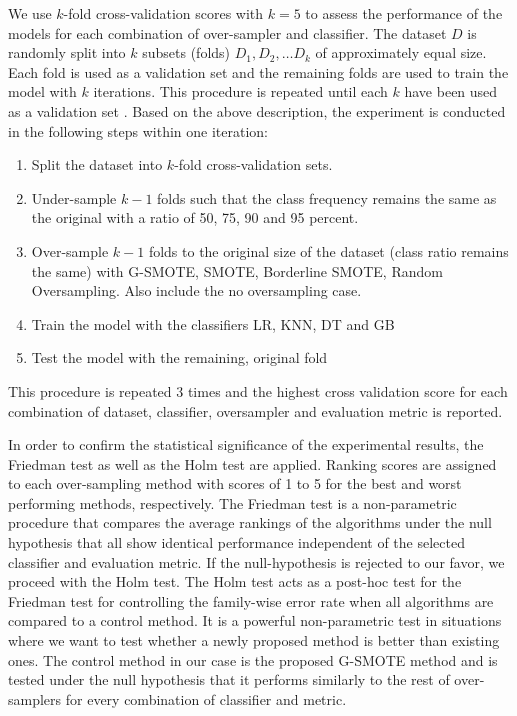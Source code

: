\documentclass[parskip=full]{scrartcl}
\begin{document}
We use \( k \)-fold cross-validation scores with \( k = 5 \) to assess the
performance of the models for each combination of over-sampler and classifier.
The dataset \( D \) is randomly split into \( k \) subsets (folds) \( D_1, D_2,
… D_k \) of approximately equal size. Each fold is used as a validation set and
the remaining folds are used to train the model with \( k \) iterations. This
procedure is repeated until each \( k \) have been used as a validation set
\cite{Han.2012}. Based on the above description, the experiment is conducted in
the following steps within one iteration:

\begin{enumerate}
	
	\item 
	Split the dataset into \( k \)-fold cross-validation sets.

	\item 
	Under-sample \( k - 1 \) folds such that the class frequency remains 
	the same as the original with a ratio of 50, 75, 90 and 95 percent.

	\item 
	Over-sample \( k - 1 \) folds to the original size of the
	dataset (class ratio remains the same) with G-SMOTE, SMOTE, Borderline
	SMOTE, Random Oversampling. Also include the no oversampling case.

	\item 
	Train the model with the classifiers LR, KNN, DT and GB

	\item 
	Test the model with the remaining, original fold

\end{enumerate}	

This procedure is repeated 3 times and the highest cross validation score for
each combination of dataset, classifier, oversampler and evaluation metric is
reported.

In order to confirm the statistical significance of the experimental results,
the Friedman test \cite{Sheldon.1996} as well as the Holm test
\cite{JanezDemsar.2006} are applied. Ranking scores are assigned to each
over-sampling method with scores of 1 to 5 for the best and worst performing
methods, respectively. The Friedman test is a non-parametric procedure that
compares the average rankings of the algorithms under the null hypothesis that
all show identical performance independent of the selected classifier and
evaluation metric. If the null-hypothesis is rejected to our favor, we proceed
with the Holm test. The Holm test acts as a post-hoc test for the Friedman test
for controlling the family-wise error rate when all algorithms are compared to a
control method. It is a powerful non-parametric test in situations where we want
to test whether a newly proposed method is better than existing ones. The
control method in our case is the proposed G-SMOTE method and is tested under
the null hypothesis that it performs similarly to the rest of over-samplers for
every combination of classifier and metric.
\end{document}
